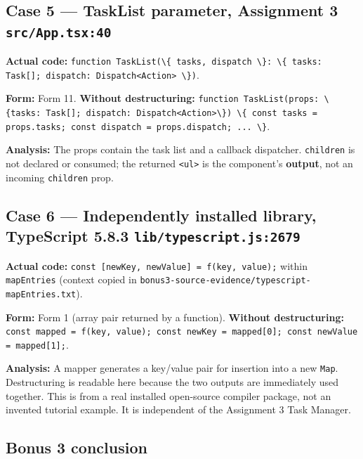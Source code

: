 \documentclass[
  9pt,
]{article}
\newcommand{\passthrough}[1]{#1}
\begin{document}
\subsection{\texorpdfstring{Case 5 --- TaskList parameter, Assignment 3
\texttt{src/App.tsx:40}}{Case 5 --- TaskList parameter, Assignment 3 src/App.tsx:40}}\label{case-5-tasklist-parameter-assignment-3-srcapp.tsx40}

\textbf{Actual code:}
\passthrough{\lstinline!function TaskList(\{ tasks, dispatch \}: \{ tasks: Task[]; dispatch: Dispatch<Action> \})!}.

\textbf{Form:} Form 11. \textbf{Without destructuring:}
\passthrough{\lstinline!function TaskList(props: \{tasks: Task[]; dispatch: Dispatch<Action>\}) \{ const tasks = props.tasks; const dispatch = props.dispatch; ... \}!}.

\textbf{Analysis:} The props contain the task list and a callback
dispatcher. \passthrough{\lstinline!children!} is not declared or
consumed; the returned \passthrough{\lstinline!<ul>!} is the component's
\textbf{output}, not an incoming \passthrough{\lstinline!children!}
prop.

\subsection{\texorpdfstring{Case 6 --- Independently installed library,
TypeScript 5.8.3
\texttt{lib/typescript.js:2679}}{Case 6 --- Independently installed library, TypeScript 5.8.3 lib/typescript.js:2679}}\label{case-6-independently-installed-library-typescript-5.8.3-libtypescript.js2679}

\textbf{Actual code:}
\passthrough{\lstinline!const [newKey, newValue] = f(key, value);!}
within \passthrough{\lstinline!mapEntries!} (context copied in
\passthrough{\lstinline!bonus3-source-evidence/typescript-mapEntries.txt!}).

\textbf{Form:} Form 1 (array pair returned by a function).
\textbf{Without destructuring:}
\passthrough{\lstinline!const mapped = f(key, value); const newKey = mapped[0]; const newValue = mapped[1];!}.

\textbf{Analysis:} A mapper generates a key/value pair for insertion
into a new \passthrough{\lstinline!Map!}. Destructuring is readable here
because the two outputs are immediately used together. This is from a
real installed open-source compiler package, not an invented tutorial
example. It is independent of the Assignment 3 Task Manager.

\subsection{Bonus 3 conclusion}\label{bonus-3-conclusion}
\end{document}
